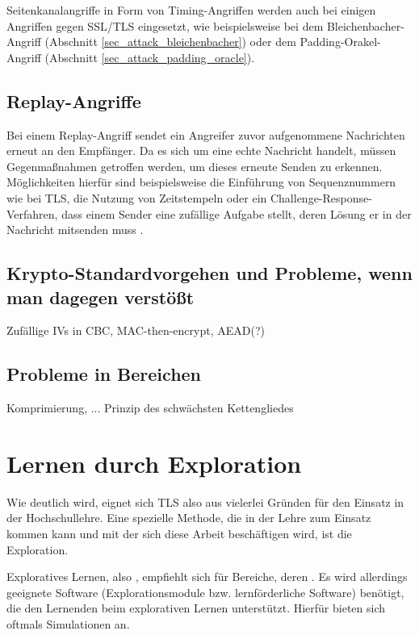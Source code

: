 Seitenkanalangriffe in Form von Timing-Angriffen werden auch bei einigen Angriffen gegen SSL/TLS eingesetzt, wie beispielsweise bei dem Bleichenbacher-Angriff (Abschnitt \ref{sec_attack_bleichenbacher}) oder dem Padding-Orakel-Angriff (Abschnitt \ref{sec_attack_padding_oracle}).

\subsection{Replay-Angriffe}

Bei einem Replay-Angriff sendet ein Angreifer zuvor aufgenommene Nachrichten erneut an den Empfänger. Da es sich um eine echte Nachricht handelt, müssen Gegenmaßnahmen getroffen werden, um dieses erneute Senden zu erkennen. Möglichkeiten hierfür sind beispielsweise die Einführung von Sequenznummern wie bei TLS, die Nutzung von Zeitstempeln oder ein Challenge-Response-Verfahren, dass einem Sender eine zufällige Aufgabe stellt, deren Lösung er in der Nachricht mitsenden muss \cite{ferguson10}.

\subsection{Krypto-Standardvorgehen und Probleme, wenn man dagegen verstößt}
Zufällige IVs in CBC, MAC-then-encrypt, AEAD(?)

\subsection{Probleme in  Bereichen}
Komprimierung, ...
Prinzip des schwächsten Kettengliedes

\section{Lernen durch Exploration}
\label{sec_exploration}

Wie deutlich wird, eignet sich TLS also aus vielerlei Gründen für den Einsatz in der Hochschullehre. Eine spezielle Methode, die in der Lehre zum Einsatz kommen kann und mit der sich diese Arbeit beschäftigen wird, ist die Exploration.

Exploratives Lernen, also , empfiehlt sich für Bereiche, deren  \cite{schubert11}. 
Es wird allerdings geeignete Software (Explorationsmodule bzw. lernförderliche Software) benötigt, die den Lernenden beim explorativen Lernen unterstützt. Hierfür bieten sich oftmals Simulationen an. 

